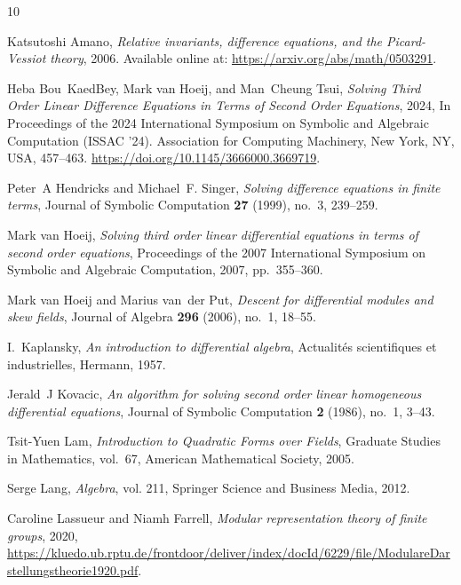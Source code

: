\documentclass[11pt,reqno]{amsart}
\theoremstyle{definition}
\begin{document}

 \newcommand{\noop}[1]{}
\begin{thebibliography}{10}

Katsutoshi Amano, \emph{{Relative invariants, difference equations, and the Picard-Vessiot theory}}, 2006. Available online at: \url{https://arxiv.org/abs/math/0503291}.

Heba Bou~KaedBey, Mark van Hoeij, and Man~Cheung Tsui, \emph{Solving Third Order Linear Difference Equations in Terms of Second Order Equations}, 2024, In Proceedings of the 2024 International Symposium on Symbolic and Algebraic Computation (ISSAC '24). Association for Computing Machinery, New York, NY, USA, 457–463. \url{https://doi.org/10.1145/3666000.3669719}.

Peter~A Hendricks and Michael~F. Singer, \emph{Solving difference equations in finite terms}, Journal of Symbolic Computation \textbf{27} (1999), no.~3, 239--259.

Mark van Hoeij, \emph{Solving third order linear differential equations in terms of second order equations}, Proceedings of the 2007 International Symposium on Symbolic and Algebraic Computation, 2007, pp.~355--360.

Mark van Hoeij and Marius van~der Put, \emph{Descent for differential modules and skew fields}, Journal of Algebra \textbf{296} (2006), no.~1, 18--55.

I.~Kaplansky, \emph{An introduction to differential algebra}, Actualit{\'e}s scientifiques et industrielles, Hermann, 1957.

Jerald~J Kovacic, \emph{An algorithm for solving second order linear homogeneous differential equations}, Journal of Symbolic Computation \textbf{2} (1986), no.~1, 3--43.

Tsit-Yuen Lam, \emph{{Introduction to Quadratic Forms over Fields}}, Graduate Studies in Mathematics, vol.~67, American Mathematical Society, 2005.

Serge Lang, \emph{Algebra}, vol. 211, Springer Science and Business Media, 2012.

Caroline Lassueur and Niamh Farrell, \emph{Modular representation theory of finite groups}, 2020, \url{https://kluedo.ub.rptu.de/frontdoor/deliver/index/docId/6229/file/ModulareDarstellungstheorie1920.pdf}.


\end{thebibliography}
\end{document}
